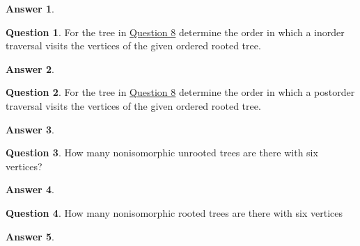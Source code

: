 \documentclass[article, 12pt]{article}
\theoremstyle{definition}
\newtheorem{question}{Question}
\newtheorem{answer}{Answer}
\begin{document}
    \begin{answer} \
        \label{a8}
        \begin{figure}[H]
            \centering
        \end{figure}
    \end{answer}

    \begin{question}
        \label{q9}
        For the tree in \hyperref[a8]{Question 8} determine the order in which a inorder traversal visits the vertices of the given ordered rooted tree.    
    \end{question}

    \begin{answer}
        \label{a9}
    \end{answer}

    \begin{question}
        \label{q10}
        For the tree in \hyperref[a8]{Question 8} determine the order in which a postorder traversal visits the vertices of the given ordered rooted tree.
    \end{question}

    \begin{answer}
        \label{a10}
    \end{answer}

    \begin{question}
        \label{q11}
        How many nonisomorphic unrooted trees are there with six vertices?
    \end{question}

    \begin{answer}
        \label{a11}
    \end{answer}

    \begin{question}
        \label{q12}
        How many nonisomorphic rooted trees are there with six vertices    
    \end{question}

    \begin{answer}
        \label{a12}
    \end{answer}
\end{document}
